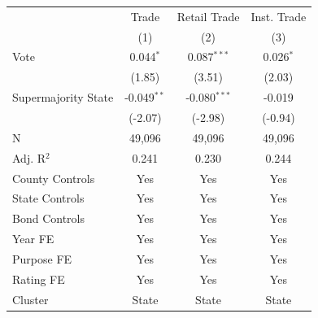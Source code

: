\begingroup
\centering
\begin{tabular*}{\textwidth}{@{\extracolsep{\fill}}lccc}
   \toprule
                       & Trade         & Retail Trade   & Inst. Trade\\  
                       & (1)           & (2)            & (3)\\  
   \midrule 
   Vote                & 0.044$^{*}$   & 0.087$^{***}$  & 0.026$^{*}$\\   
                       & (1.85)       & (3.51)        & (2.03)\\   
   Supermajority State & -0.049$^{**}$ & -0.080$^{***}$ & -0.019\\   
                       & (-2.07)      & (-2.98)       & (-0.94)\\   
   \hline
   N        & 49,096        & 49,096         & 49,096\\  
   Adj. R$^2$      & 0.241         & 0.230          & 0.244\\  
   County Controls     & Yes           & Yes            & Yes\\  
   State Controls      & Yes           & Yes            & Yes\\  
   Bond Controls       & Yes           & Yes            & Yes\\  
   Year FE             & Yes           & Yes            & Yes\\  
   Purpose FE          & Yes           & Yes            & Yes\\  
   Rating FE           & Yes           & Yes            & Yes\\  
   Cluster              & State & State & State\\  
   \bottomrule
\end{tabular*}
\par\endgroup
